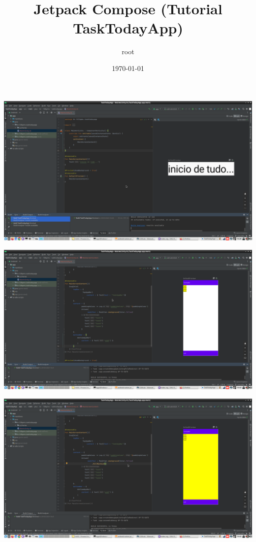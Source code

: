 \documentclass[11pt]{article}
\author{root}
\date{\today}
\title{Jetpack Compose (Tutorial TaskTodayApp)}
\begin{document}
\maketitle
\tableofcontents

\begin{center}
\includegraphics[width=.9\linewidth]{./Captura de tela de 2023-03-29 16-26-48.png}
\end{center}
\begin{center}
\includegraphics[width=.9\linewidth]{./Captura de tela de 2023-03-29 16-42-02.png}
\end{center}
\begin{center}
\includegraphics[width=.9\linewidth]{./Captura de tela de 2023-03-29 16-42-42.png}
\end{center}
\end{document}
